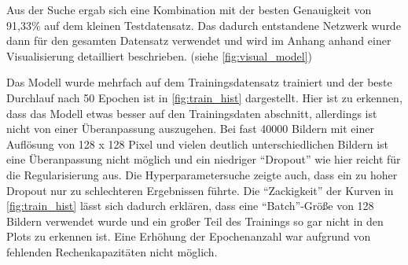 \begin{table}
    \centering
    \caption{Die besten fünf Ergebnisse der zufälligen Gittersuche mit der Genauigkeit auf den 3000 Testdaten und den zugehörigen Hyperparametern}
    \label{tab:grid_search}
\end{table}

Aus der Suche ergab sich eine Kombination mit der besten Genauigkeit von 91,33\% auf dem kleinen Testdatensatz.
Das dadurch entstandene Netzwerk wurde dann für den gesamten Datensatz verwendet und wird im Anhang anhand einer Visualisierung detailliert beschrieben. (siehe \autoref{fig:visual_model})

Das Modell wurde mehrfach auf dem Trainingsdatensatz trainiert und der beste Durchlauf nach 50 Epochen ist in \autoref{fig:train_hist} dargestellt.
Hier ist zu erkennen, dass das Modell etwas besser auf den Trainingsdaten abschnitt, allerdings ist nicht von einer Überanpassung auszugehen.
Bei fast 40000 Bildern mit einer Auflösung von 128 x 128 Pixel und vielen deutlich unterschiedlichen Bildern ist eine Überanpassung nicht möglich 
und ein niedriger \enquote{Dropout} wie hier reicht für die Regularisierung aus.
Die Hyperparametersuche zeigte auch, dass ein zu hoher Dropout nur zu schlechteren Ergebnissen führte.
Die \enquote{Zackigkeit} der Kurven in \autoref{fig:train_hist} lässt sich dadurch erklären, dass eine \enquote{Batch}-Größe von 128 Bildern verwendet wurde und ein großer Teil des Trainings so gar nicht in den Plots zu erkennen ist.
Eine Erhöhung der Epochenanzahl war aufgrund von fehlenden Rechenkapazitäten nicht möglich.

